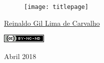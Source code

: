 \thispagestyle{empty}

\begin{center}
  \begin{figure}[H]
    \begin{center}
      \hspace{-1cm}
      \texttt{[image: titlepage]}
  ~\cite{FrontPageIMG}
    \end{center}      
  \end{figure}

  \vskip 2cm

  \hspace{-1cm}
  \begin{minipage}[c]{17cm}
    \begin{center}

{\huge {}\vskip 0.15cm %

{\large \href{https://www.linkedin.com/in/reinaldo-gil-lima-de-carvalho/}{Reinaldo Gil Lima de Carvalho}} %

{\includegraphics[width=0.1\columnwidth]{imgs/license-CC-BY-NC-ND_header.png}}

}
    \end{center}
  \end{minipage}

  \vskip 14cm

  {\huge Abril 2018} %
\end{center}
